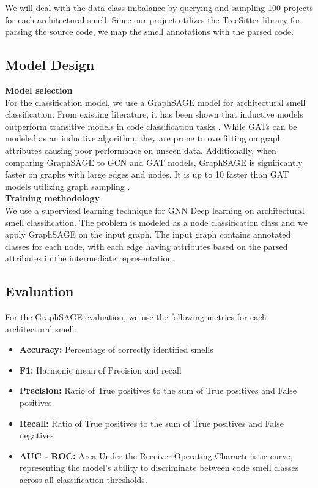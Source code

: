 We will deal with the data class imbalance by querying and sampling 100 projects for each architectural smell.
Since our project utilizes the TreeSitter library for parsing the source code, we map the smell annotations
with the parsed code.
\\

\subsection{Model Design}
\textbf{Model selection}
\\

For the classification model, we use a GraphSAGE model for architectural smell classification.
From existing literature, it has been shown that inductive models outperform transitive models
in code classification tasks \cite{HanYu2024}. While GATs can be modeled as an inductive algorithm,
they are prone to overfitting on graph attributes causing poor performance on unseen data. Additionally, 
when comparing GraphSAGE to GCN and GAT models, GraphSAGE is significantly faster on graphs with large edges and
nodes. It is up to 10 faster than GAT models utilizing graph sampling \cite{bajaj2024graph}.
\\

\textbf{Training methodology}
\\

We use a supervised learning technique for GNN Deep learning on architectural smell classification.
The problem is modeled as a node classification class and we apply GraphSAGE on the input graph.
The input graph contains annotated classes for each node, with each edge having attributes based on the parsed
attributes in the intermediate representation.
\\


\subsection{Evaluation}
For the GraphSAGE evaluation, we use the following metrics
for each architectural smell:
\\
\begin{itemize}
    \item \textbf{Accuracy:} Percentage of correctly identified smells
    \item \textbf{F1:} Harmonic mean of Precision and recall
    \item \textbf{Precision:} Ratio of True positives to the sum of True positives and False positives
    \item \textbf{Recall:} Ratio of True positives to the sum of True positives and False negatives
    \item \textbf{AUC - ROC:} Area Under the Receiver Operating Characteristic curve, representing the model's ability to discriminate between code smell classes across all classification thresholds.
\end{itemize}


